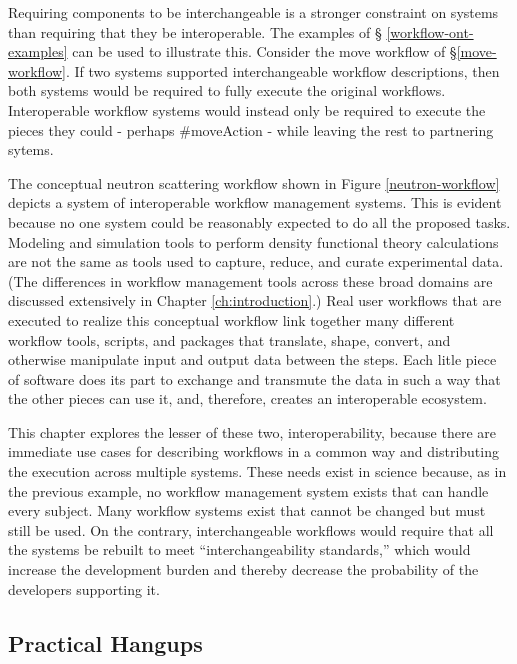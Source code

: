 Requiring components to be interchangeable is a stronger constraint on systems
than requiring that they be interoperable. The examples of \S
\ref{workflow-ont-examples} can be used to illustrate this. Consider the move
workflow of \S \ref{move-workflow}. If two systems supported interchangeable
workflow descriptions, then both systems would be required to fully execute the
original workflows. Interoperable workflow systems would instead only be
required to execute the pieces they could - perhaps \#moveAction - while leaving
the rest to partnering sytems.

The conceptual neutron scattering workflow shown in Figure
\ref{neutron-workflow} depicts a system of interoperable workflow management
systems. This is evident because no one system could be reasonably expected to
do all the proposed tasks. Modeling and simulation tools to perform density
functional theory calculations are not the same as tools used to capture,
reduce, and curate experimental data. (The differences in workflow management tools
across these broad domains are discussed extensively in Chapter
\ref{ch:introduction}.) Real user workflows that are executed to realize this
conceptual workflow link together many different workflow tools, scripts, and
packages that translate, shape, convert, and otherwise manipulate input and
output data between the steps. Each litle piece of software does its part to
exchange and transmute the data in such a way that the other pieces can use it,
and, therefore, creates an interoperable ecosystem.

This chapter explores the lesser of these two, interoperability, because there
are immediate use cases for describing workflows in a common way and
distributing the execution across multiple systems. These needs exist in
science because, as in the previous example, no workflow management system
exists that can handle every subject. Many workflow systems exist that cannot be
changed but must still be used. On the contrary, interchangeable workflows
would require that all the systems be rebuilt to meet ``interchangeability
standards,'' which would increase the development burden and thereby decrease
the probability of the developers supporting it.

\subsection{Practical Hangups}
\label{practicality}

